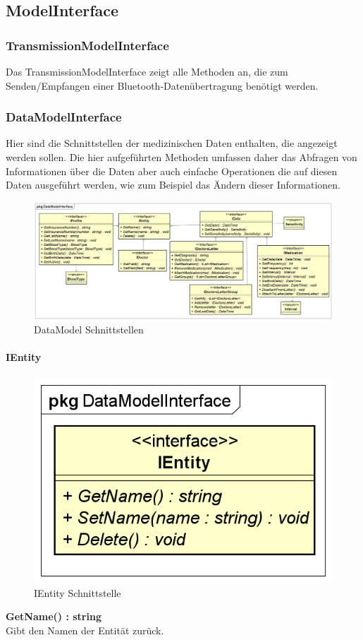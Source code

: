\documentclass[a4paper]{scrreprt}
\begin{document}
\subsection{ModelInterface}
\subsubsection{TransmissionModelInterface}
Das TransmissionModelInterface zeigt alle Methoden an, die zum Senden/Empfangen einer Bluetooth-Datenübertragung benötigt werden. %
\subsubsection{DataModelInterface}
Hier sind die Schnittstellen der medizinischen Daten enthalten, die angezeigt werden sollen. Die hier aufgeführten Methoden umfassen daher das Abfragen von Informationen über die Daten aber auch einfache Operationen die auf diesen Daten ausgeführt werden, wie zum Beispiel das Ändern dieser Informationen.

\begin{figure}[H]
\centering
\includegraphics[width=0.75\textheight]{graphics/Klassendiagramme/Model/DataModelInterfacePackage.png}
\caption{DataModel Schnittstellen}
\end{figure}

\paragraph{IEntity}
\begin{figure}[H]
\centering
\includegraphics[width=0.45\textheight]{graphics/Klassendiagramme/Model/IEntity.png}
\caption{IEntity Schnittstelle}
\end{figure}
\textbf{GetName() : string}\\
Gibt den Namen der Entität zurück.
\end{document}
